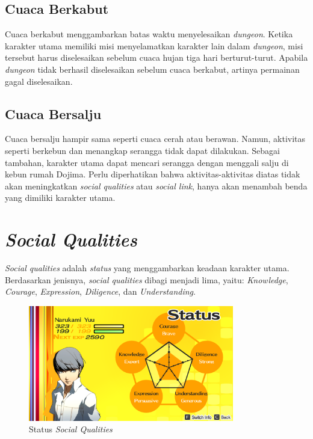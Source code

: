 \subsection{Cuaca Berkabut}
Cuaca berkabut menggambarkan batas waktu menyelesaikan \textit{dungeon}. Ketika karakter utama memiliki misi menyelamatkan karakter lain dalam \textit{dungeon}, misi tersebut harus diselesaikan sebelum cuaca hujan tiga hari berturut-turut. Apabila \textit{dungeon} tidak berhasil diselesaikan sebelum cuaca berkabut, artinya permainan gagal diselesaikan.

\subsection{Cuaca Bersalju}
Cuaca bersalju hampir sama seperti cuaca cerah atau berawan. Namun, aktivitas seperti berkebun dan menangkap serangga tidak dapat dilakukan. Sebagai tambahan, karakter utama dapat mencari serangga dengan menggali salju di kebun rumah Dojima. Perlu diperhatikan bahwa aktivitas-aktivitas diatas tidak akan meningkatkan \textit{social qualities} atau \textit{social link}, hanya akan menambah benda yang dimiliki karakter utama.


\section{\textit{Social Qualities}}
\textit{Social qualities} adalah \textit{status} yang menggambarkan keadaan karakter utama. Berdasarkan jenisnya, \textit{social qualities} dibagi menjadi lima, yaitu: \textit{Knowledge}, \textit{Courage}, \textit{Expression}, \textit{Diligence}, dan \textit{Understanding}.

\pagebreak
\begin{figure}[htbp]
    \centering
    \includegraphics[width=0.8\textwidth]{resources/Dokumentasi/Screenshot (460).png}
    \caption{\label{socialstats}Status \textit{Social Qualities}}
\end{figure}

